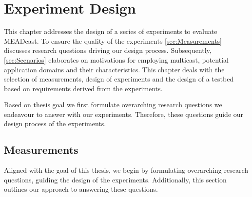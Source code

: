 \chapter{Experiment Design} %
\label{chap:Design}
This chapter addresses the design of a series of experiments to evaluate
    MEADcast.
To ensure the quality of the experiments \autoref{sec:Measurements} discusses
    research questions driving our design process.
Subsequently, \autoref{sec:Scenarios} elaborates on motivations for employing
    multicast, potential application domains and their characteristics.
This chapter deals with the selection of measurements, design of experiments
    and the design of a testbed based on requirements derived from the
    experiments.

Based on thesis goal we first formulate overarching research questions we
    endeavour to answer with our experiments. 
Therefore, these questions guide our design process of the experiments.




\section{Measurements} %
\label{sec:Measurements}
Aligned with the goal of this thesis, we begin by formulating  overarching
    research questions, guiding the design of the experiments.
Additionally, this section outlines our approach to answering these questions.

